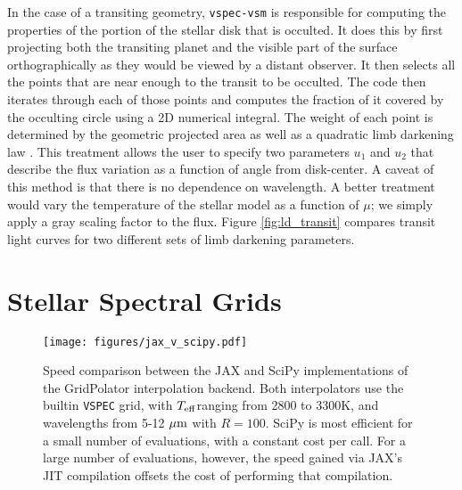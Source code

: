 \documentclass[linenumbers,preprint,authoryear]{elsarticle}
\newcommand{\teff}{$T_{\rm eff}$}
\newcommand{\vspec}[1]{\texttt{VSPEC}#1}
\begin{document}
In the case of a transiting geometry, \texttt{vspec-vsm} is responsible for computing the properties of the portion of the stellar disk that is occulted. It does this by first projecting both the transiting planet and the visible part of the surface orthographically as they would be viewed by a distant observer. It then selects all the points that are near enough to the transit to be occulted. The code then iterates through each of those points and computes the fraction of it covered by the occulting circle using a 2D numerical integral. The weight of each point is determined by the geometric projected area as well as a quadratic limb darkening law \citep[see][]{espinoza2015}. This treatment allows the user to specify two parameters $u_1$ and $u_2$ that describe the flux variation as a function of angle from disk-center. A caveat of this method is that there is no dependence on wavelength. A better treatment would vary the temperature of the stellar model as a function of $\mu$; we simply apply a gray scaling factor to the flux. Figure \ref{fig:ld_transit} compares transit light curves for two different sets of limb darkening parameters.


\section{Stellar Spectral Grids}
\label{sec:gridpolator}

\begin{figure}
    \centering
    \texttt{[image: figures/jax\_v\_scipy.pdf]}
    \caption{
        Speed comparison between the JAX and SciPy implementations of the GridPolator interpolation backend. Both interpolators use the builtin \vspec{} grid, with \teff ranging from 2800 to 3300K, and wavelengths from 5-12 ${\rm \mu m}$ with $R=100$. SciPy is most efficient for a small number of evaluations, with a constant cost per call. For a large number of evaluations, however, the speed gained via JAX's JIT compilation offsets the cost of performing that compilation.
    }
    \label{fig:jax_v_scipy}
\end{figure}
\end{document}
